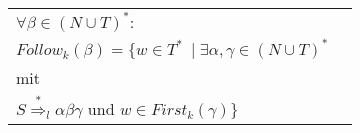 \documentclass[
    border=0.2cm,
    convert={density=600}
]{standalone}
\begin{document}
	\begin{tabular}{lp{11 cm}}
$\forall \beta \in (N \cup T)^*:$\\

$Follow_k(\beta) = \lbrace w \in T^*\ \mid \exists \alpha, \gamma \in  (N \cup T)^*$\\
mit \\
$S \overset{*}{\Rightarrow}_l \alpha \beta \gamma$ und $w \in First_k(\gamma) \rbrace$

\end{tabular}
\end{document}
